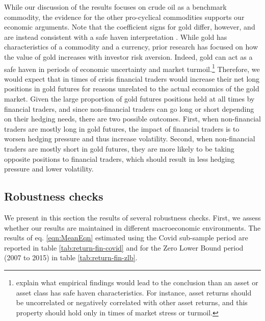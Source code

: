 While our discussion of the results focuses on crude oil as a benchmark commodity, the evidence for the other pro-cyclical commodities supports our economic arguments. Note that the coefficient signs for gold differ, however, and are instead consistent with a safe haven interpretation \citep*{erb2013golden,bredin2015does}. While gold has characteristics of a commodity and a currency, prior research has focused on how the value of gold increases with investor risk aversion. Indeed, gold can act as a safe haven in periods of economic uncertainty and market turmoil.\footnote{ \citet{baur2010gold} explain what empirical findings would lead to the conclusion than an asset or asset class has safe haven characteristics. For instance, asset returns should be uncorrelated or negatively correlated with other asset returns, and this property should hold only in times of market stress or turmoil.}
Therefore, we would expect that in times of crisis financial traders would increase their net long positions in gold futures for reasons unrelated to the actual economics of the gold market. Given the large proportion of gold futures positions held at all times by financial traders, and since non-financial traders can go long or short depending on their hedging needs, there are two possible outcomes. First, when non-financial traders are mostly long in  gold futures, the impact of financial traders is to worsen  hedging pressure  and thus increase volatility. Second, when non-financial traders are mostly short in gold futures, they are more likely to be taking opposite positions to financial traders, which should result in less hedging pressure and lower volatility.

\subsection{Robustness checks}
We present in this section the results of several robustness checks. First, we assess whether our results are maintained in different  macroeconomic environments. The  results of eq. \ref{eqn:MeanEqn} estimated using the Covid sub-sample period are reported in table \ref{tab:return-fin-covid} and for the Zero Lower Bound period (2007 to 2015)  in table \ref{tab:return-fin-zlb}. 

